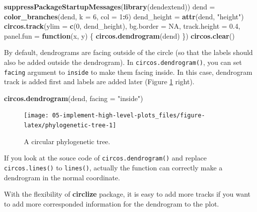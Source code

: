\documentclass[]{book}
\newenvironment{Shaded}{\begin{snugshade}}{\end{snugshade}}
\newcommand{\KeywordTok}[1]{\textcolor[rgb]{0.13,0.29,0.53}{\textbf{#1}}}
\newcommand{\DataTypeTok}[1]{\textcolor[rgb]{0.13,0.29,0.53}{#1}}
\newcommand{\DecValTok}[1]{\textcolor[rgb]{0.00,0.00,0.81}{#1}}
\newcommand{\FloatTok}[1]{\textcolor[rgb]{0.00,0.00,0.81}{#1}}
\newcommand{\StringTok}[1]{\textcolor[rgb]{0.31,0.60,0.02}{#1}}
\newcommand{\OtherTok}[1]{\textcolor[rgb]{0.56,0.35,0.01}{#1}}
\newcommand{\ControlFlowTok}[1]{\textcolor[rgb]{0.13,0.29,0.53}{\textbf{#1}}}
\newcommand{\OperatorTok}[1]{\textcolor[rgb]{0.81,0.36,0.00}{\textbf{#1}}}
\newcommand{\NormalTok}[1]{#1}
\theoremstyle{definition}
\theoremstyle{definition}
\theoremstyle{remark}
\begin{document}
\begin{Shaded}
\begin{Highlighting}[]
\KeywordTok{suppressPackageStartupMessages}\NormalTok{(}\KeywordTok{library}\NormalTok{(dendextend))}
\NormalTok{dend =}\StringTok{ }\KeywordTok{color_branches}\NormalTok{(dend, }\DataTypeTok{k =} \DecValTok{6}\NormalTok{, }\DataTypeTok{col =} \DecValTok{1}\OperatorTok{:}\DecValTok{6}\NormalTok{)}
\NormalTok{dend_height =}\StringTok{ }\KeywordTok{attr}\NormalTok{(dend, }\StringTok{"height"}\NormalTok{)}
\KeywordTok{circos.track}\NormalTok{(}\DataTypeTok{ylim =} \KeywordTok{c}\NormalTok{(}\DecValTok{0}\NormalTok{, dend_height), }\DataTypeTok{bg.border =} \OtherTok{NA}\NormalTok{, }
    \DataTypeTok{track.height =} \FloatTok{0.4}\NormalTok{, }\DataTypeTok{panel.fun =} \ControlFlowTok{function}\NormalTok{(x, y) \{}
        \KeywordTok{circos.dendrogram}\NormalTok{(dend)}
\NormalTok{\})}
\KeywordTok{circos.clear}\NormalTok{()}
\end{Highlighting}
\end{Shaded}

By default, dendrograms are facing outside of the circle (so that the
labels should also be added outside the dendrogram). In
\texttt{circos.dendrogram()}, you can set \texttt{facing} argument to
\texttt{inside} to make them facing inside. In this case, dendrogram
track is added first and labels are added later (Figure
\ref{fig:phylogenetic-tree} right).

\begin{Shaded}
\begin{Highlighting}[]
\KeywordTok{circos.dendrogram}\NormalTok{(dend, }\DataTypeTok{facing =} \StringTok{"inside"}\NormalTok{)}
\end{Highlighting}
\end{Shaded}

\begin{figure}

{\centering \texttt{[image: 05-implement-high-level-plots\_files/figure-latex/phylogenetic-tree-1]} 

}

\caption{A circular phylogenetic tree.}\label{fig:phylogenetic-tree}
\end{figure}

If you look at the souce code of \texttt{circos.dendrogram()} and
replace \texttt{circos.lines()} to \texttt{lines()}, actually the
function can correctly make a dendrogram in the normal coordinate.

With the flexibility of \textbf{circlize} package, it is easy to add
more tracks if you want to add more corresponded information for the
dendrogram to the plot.
\end{document}
